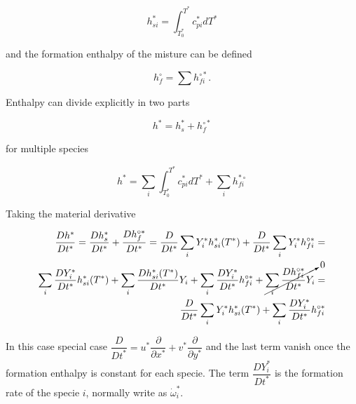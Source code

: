 \begin{equation} 
h_{si}^*
=
\int_{T_0^*}^{T^*}
c_{pi}^*dT^*
\end{equation} 

and the formation enthalpy of the misture  
can be defined 

\begin{equation} 
   h_{f}^\circ
   =
   \sum
   h_{fi}^{\circ*}
   .
\end{equation} 

Enthalpy can divide explicitly in two parts 

\begin{equation} 
    h^*=h_s^*+h_f^{\circ*}
\end{equation} 

for multiple species 

\begin{equation} 
    h^*=
    \sum_i
    \int_{T_0^*}^{T^*}
    c_{pi}^*dT^*
    +
    \sum_i h_{fi}^{*\circ}
\end{equation} 


Taking the material derivative

\begin{equation} 
\begin{split}
    \frac{D h^*}{D t^*}
    =
    \frac{D h_s^*}{D t^*}
    +
    \frac{D h_f^{\circ *}}{D t^*}
    =
    \frac{D }{D t^*}
    \sum_i Y_i^* h_{si}^*(T^*)
    +
    \frac{D }{D t^*}
    \sum_i Y_i^* h_{fi}^{\circ*}
    =
    \\
    \sum_i  
    \frac{D Y_i^*}{D t^*}
    h_{si}^*(T^*)
    +
    \sum_i  
    \frac{D h_{si}^*(T^*)}{D t^*}
    Y_i
    +
    \sum_i  
    \frac{D Y_i^*}{D t^*}
    h_{fi}^{\circ*}
    +
    \cancelto{0}{
    \sum_i  
    \frac{D h_{fi}^{\circ*}}{D t^*}
    Y_i
    }
    =
    \\
    \frac{D }{D t^*}
    \sum_i Y_i^* h_{si}^*(T^*)
    +
    \sum_i  
    \frac{D Y_i^*}{D t^*}
    h_{fi}^{\circ*}
\end{split} 
\end{equation} 

In this case special case $\dfrac{D}{D t^*}=u^*\dfrac{\partial }{\partial x^*}+v^*\dfrac{\partial }{\partial y^*}$ and 
the last term vanish once the formation enthalpy is constant for each specie. 
The term $\dfrac{D Y_i^*}{D t^*}$ is the formation rate of the specie $i$, normally 
write as $\dot{\omega}_i^*$.

%

